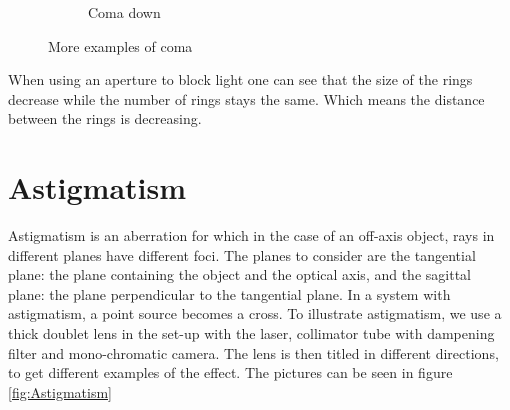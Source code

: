 \documentclass[a4paper,12pt]{article}
\begin{document}
\begin{figure}[H]
\begin{subfigure}{0.3\textwidth}
                \caption{Coma down}
                \label{fig:comaned}
        \end{subfigure}
        \caption{More examples of coma}\label{fig:Coma2}
\end{figure}
When using an aperture to block light one can see that the size of the rings decrease while the number of rings stays the same. Which means the distance between the rings is decreasing.
 
\section{Astigmatism}
Astigmatism is an aberration for which in the case of an off-axis object, rays in different planes have different foci. The planes to consider are the tangential plane: the plane containing the object and the optical axis, and the sagittal plane: the plane perpendicular to the tangential plane. In a system with astigmatism, a point source becomes a cross. To illustrate astigmatism, we use a thick doublet lens in the set-up with the laser, collimator tube with dampening filter and mono-chromatic camera. The lens is then titled in different directions, to get different examples of the effect. The pictures can be seen in figure \ref{fig:Astigmatism}
\end{document}
